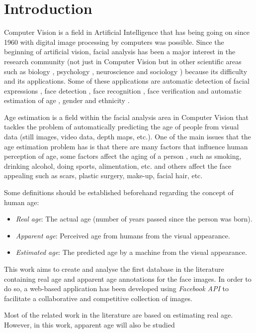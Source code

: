 \chapter{Introduction} \label{chap:introduction}

Computer Vision is a field in Artificial Intelligence that has being going on since 1960 with digital image processing by computers was possible. Since the beginning of artificial vision, facial analysis has been a major interest in the research community (not just in Computer Vision but in other scientific areas such as biology \cite{bhl24064}, psychology \cite{ekm02}, neuroscience \cite{freiwald2009face} and sociology \cite{kemper1978social}) because its difficulty and its applications. Some of these applications are automatic detection of facial expressions \cite{cohen2003facial}, face detection \cite{hsu2002face}, face recognition \cite{wright2009robust}, face verification \cite{taigman2014deepface} and automatic estimation of age \cite{4359348}, gender \cite{alexandre2010gender} and ethnicity \cite{hosoi2004ethnicity}.

Age estimation is a field within the facial analysis area in Computer Vision that tackles the problem of automatically predicting the age of people from visual data (still images, video data, depth maps, etc.). One of the main issues that the age estimation problem has is that there are many factors that influence human perception of age, some factors affect the aging of a person \cite{shephard1997aging}, such as smoking, drinking alcohol, doing sports, alimentation, etc. and others affect the face appealing such as scars, plastic surgery, make-up, facial hair, etc.

Some definitions should be established beforehand regarding the concept of human age:
\begin{itemize}
	\item \textit{Real age}: The actual age (number of years passed since the person was born).
	\item \textit{Apparent age}: Perceived age from humans from the visual appearance. 
	\item \textit{Estimated age}: The predicted age by a machine from the visual appearance.
\end{itemize}



This work aims to create and analyse  the first database in the literature containing real age and apparent age annotations for the face images. In order to do so, a web-based application has been developed using \textit{Facebook API} to facilitate a collaborative and competitive collection of images.


Most of the related work in the literature are based on estimating real age. However, in this work, apparent age will also be studied


